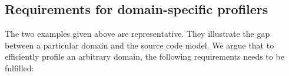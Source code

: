 \documentclass[runningheads]{llncs}
\newcommand{\ct}{\lstinline[backgroundcolor=\color{white},basicstyle=\footnotesize\ttfamily]}
\newcommand{\ugh}[1]{\textcolor{red}{\uwave{#1}}} %
\newcommand{\lr}[1]{\nb{Lukas}{orange}{#1}}
\begin{document}
% 
% 
% 
% 

\subsection{Requirements for domain-specific profilers}

The two examples given above are representative. They illustrate the gap between a particular domain and the source code model. We argue that to efficiently profile an arbitrary domain, the following requirements needs to be fulfilled:
\end{document}
